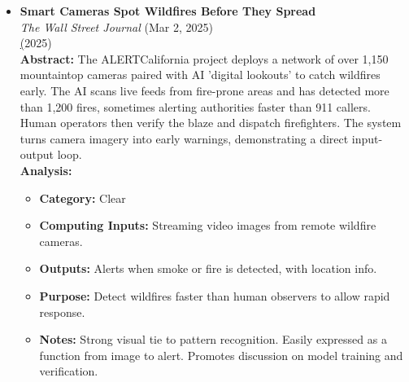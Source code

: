 \documentclass[11pt]{article}
\begin{document}
\begin{itemize}
\item \textbf{Smart Cameras Spot Wildfires Before They Spread} \\
\textit{The Wall Street Journal} (Mar 2, 2025)\\
\href{https://technews.acm.org/archives.cfm?fo=2025-03-mar#33} (2025)\\
\textbf{Abstract:} The ALERTCalifornia project deploys a network of over 1,150 mountaintop cameras paired with AI 'digital lookouts' to catch wildfires early. The AI scans live feeds from fire-prone areas and has detected more than 1,200 fires, sometimes alerting authorities faster than 911 callers. Human operators then verify the blaze and dispatch firefighters. The system turns camera imagery into early warnings, demonstrating a direct input-output loop.\\
\textbf{Analysis:}\\
\begin{itemize}
\item \textbf{Category:} Clear
\item \textbf{Computing Inputs:} Streaming video images from remote wildfire cameras.
\item \textbf{Outputs:} Alerts when smoke or fire is detected, with location info.
\item \textbf{Purpose:} Detect wildfires faster than human observers to allow rapid response.
\item \textbf{Notes:} Strong visual tie to pattern recognition. Easily expressed as a function from image to alert. Promotes discussion on model training and verification.
\end{itemize}


\end{itemize}
\end{document}
